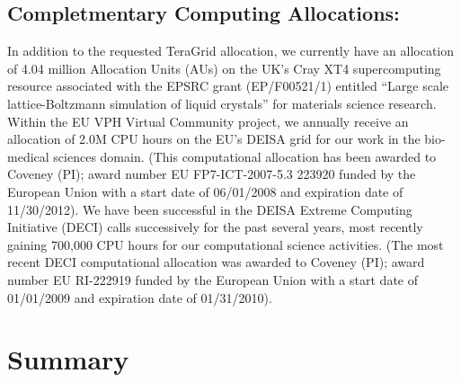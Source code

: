 \documentclass[a4paper,10pt]{article}
\begin{document}
\subsection{Completmentary Computing Allocations:} In addition to the requested TeraGrid allocation, we currently have an allocation of 4.04 million Allocation Units (AUs) on the UK's Cray XT4 supercomputing resource associated with the EPSRC grant (EP/F00521/1) entitled ``Large scale lattice-Boltzmann simulation of liquid crystals'' for materials science research. Within the EU VPH Virtual Community project, we annually receive an allocation of 2.0M CPU hours on the EU's DEISA grid for our work in the bio-medical sciences domain.  (This computational allocation has been awarded to Coveney (PI); award number EU FP7-ICT-2007-5.3 223920 funded by the European Union with a start date of 06/01/2008 and expiration date of 11/30/2012).  We have been successful in the DEISA Extreme Computing Initiative (DECI) calls successively for the past several years, most recently gaining 700,000 CPU hours for our computational science activities.  (The most recent DECI computational allocation was awarded to Coveney (PI); award number EU RI-222919 funded by the European Union with a start date of 01/01/2009 and expiration date of 01/31/2010).

% 



\section*{Summary}
\end{document}
